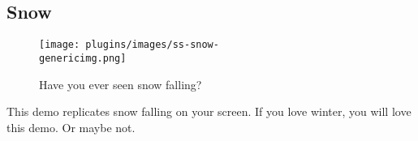 \subsection{Snow}
\begin{figure}[h!]
\begin{center}
\texttt{[image: plugins/images/ss-snow-\\genericimg.png]}
\end{center}
\caption{Have you ever seen snow falling?}
\end{figure}
This demo replicates snow falling on your screen. If you love winter,
you will love this demo.  Or maybe not.
